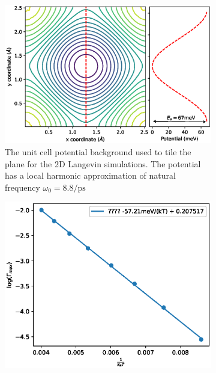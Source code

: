 \documentclass{article}
\newcommand{\ips}{\si{\per\pico\second}}
\begin{document}
\begin{figure}
	\centering
	\begin{subfigure}{0.59\textwidth}
		\includegraphics[width=1.0\textwidth]{pot_surface}
		\caption{The unit cell potential background used to tile the plane for the 2D Langevin simulations. The potential has a local harmonic approximation of natural frequency $\omega_0=8.8\ips$}
		\label{fig:pot_surface}
	\end{subfigure}
	\begin{subfigure}{0.39\textwidth}
		\includegraphics[width=1.0\textwidth]{ahrrenius}
		\caption{}
		\label{fig:ahrrenius}
	\end{subfigure}
\end{figure}
\end{document}
